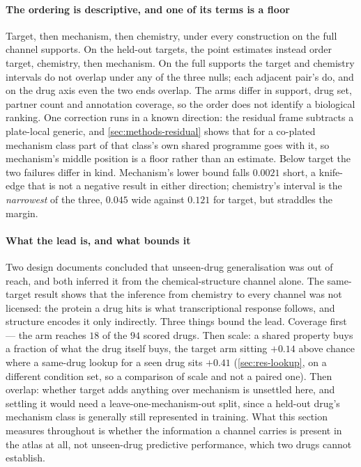 \paragraph{The ordering is descriptive, and one of its terms is a floor} Target,
then mechanism, then chemistry, under every construction on the full channel
supports. On the held-out targets, the point estimates instead order target,
chemistry, then mechanism. On the full supports the target and chemistry
intervals do not overlap under any of the three nulls; each adjacent pair's do,
and on the drug axis even the two ends overlap.
The arms differ in support, drug set, partner count and annotation coverage, so
the order does not identify a biological ranking. One correction runs in a known
direction: the residual frame subtracts a plate-local generic, and
\cref{sec:methods-residual} shows that for a co-plated mechanism class part of
that class's own shared programme goes with it, so mechanism's middle position is
a floor rather than an estimate. Below target the two failures differ in kind.
Mechanism's lower bound falls $0.0021$ short, a knife-edge that is not a negative
result in either direction; chemistry's interval is the \emph{narrowest} of the
three, $0.045$ wide against $0.121$ for target, but straddles the margin.

\paragraph{What the lead is, and what bounds it} Two design documents concluded
that unseen-drug generalisation was out of reach, and both inferred it from the
chemical-structure channel alone. The same-target result shows that the inference
from chemistry to every channel was not licensed: the protein a drug hits is what
transcriptional response follows, and structure encodes it only indirectly. Three
things bound the lead. Coverage first --- the arm reaches $18$ of the $94$ scored
drugs. Then scale: a shared property buys a fraction of what the drug itself buys,
the target arm sitting $+0.14$ above chance where a same-drug lookup for a seen
drug sits $+0.41$ (\cref{sec:res-lookup}, on a different condition set, so a
comparison of scale and not a paired one). Then overlap: whether target adds
anything over mechanism is unsettled here, and settling it would need a
leave-one-mechanism-out split, since a held-out drug's mechanism class is
generally still represented in training. What this section measures throughout is
whether the information a channel carries is present in the atlas at all, not
unseen-drug predictive performance, which two drugs cannot establish.


